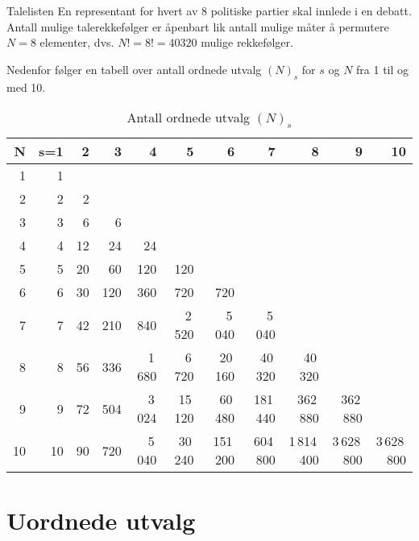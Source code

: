 \begin{eksempel}{Talelisten}
En representant for hvert av 8 politiske partier skal innlede i en
debatt. Antall mulige talerekkefølger er åpenbart lik antall
mulige måter å permutere $N=8$ elementer, dvs. $N!=8!=40320$
mulige rekkefølger.
\end{eksempel}

\noindent     Nedenfor følger en tabell over antall ordnede utvalg $(N)_s$
for $s$ og $N$ fra 1 til og med 10.
\renewcommand{\arraystretch}{1.2}
\begin{table}
\begin{tabular}{|r|rrrrrrrrrr|} \hline 
N&s=1&2&3&4&5&6&7&8&9&10 \\ \hline
1&  1& & & & & & & & &   \\ 
2&  2&2& & & & & & & &  \\
3&  3&6&6& & & & & & &  \\
4&  4&12&24&24& & & & & & \\
5&  5&20&60&120&120& & & & &  \\
6&  6&30&120&360&720&720& & & & \\
7&  7&42&210&840&2\,520&5\,040&5\,040& & &  \\
8&  8&56&336&1\,680&6\,720&20\,160&40\,320&40\,320& &  \\
9&  9&72&504&3\,024&15\,120&60\,480&181\,440&362\,880&362\,880&  \\
10& 10&90&720&5\,040&30\,240&151\,200&604\,800&1\,814\,400&3\,628\,800&3\,628\,800\\[2mm]
\hline
\end{tabular}
\caption{Antall ordnede utvalg $(N)_s$}
\label{tab:antall_ordnede}
\end{table}

\section{Uordnede utvalg}

\begin{center}  \end{center}

